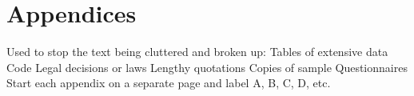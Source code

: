 \section{Appendices}

\begin{outline}
    \1 Used to stop the text being cluttered and broken up:
        \2 Tables of extensive data
        \2 Code 
        \2 Legal decisions or laws
        \2 Lengthy quotations
        \2 Copies of sample Questionnaires
    \1 Start each appendix on a separate page and label A, B, C, D, etc.
\end{outline}
